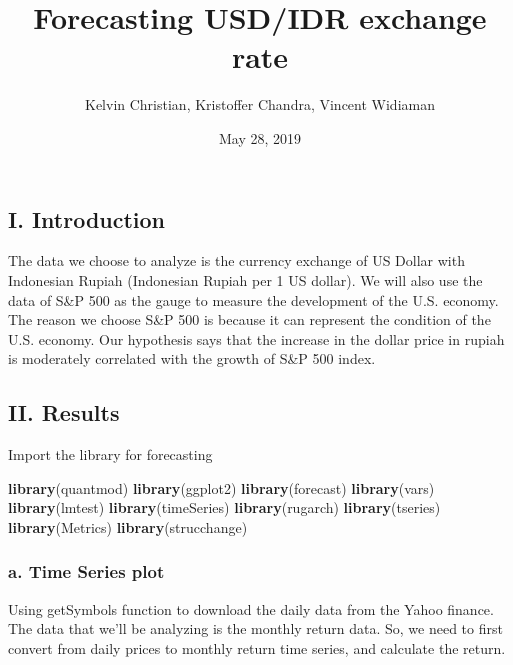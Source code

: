 \documentclass[]{article}
\title{Forecasting USD/IDR exchange rate}
\author{Kelvin Christian, Kristoffer Chandra, Vincent Widiaman}
\date{May 28, 2019}
\newenvironment{Shaded}{\begin{snugshade}}{\end{snugshade}}
\newcommand{\KeywordTok}[1]{\textcolor[rgb]{0.13,0.29,0.53}{\textbf{#1}}}
\newcommand{\NormalTok}[1]{#1}
\begin{document}
\maketitle

\subsection{I. Introduction}\label{i.-introduction}

The data we choose to analyze is the currency exchange of US Dollar with
Indonesian Rupiah (Indonesian Rupiah per 1 US dollar). We will also use
the data of S\&P 500 as the gauge to measure the development of the U.S.
economy. The reason we choose S\&P 500 is because it can represent the
condition of the U.S. economy. Our hypothesis says that the increase in
the dollar price in rupiah is moderately correlated with the growth of
S\&P 500 index.

\subsection{II. Results}\label{ii.-results}

Import the library for forecasting

\begin{Shaded}
\begin{Highlighting}[]
\KeywordTok{library}\NormalTok{(quantmod)}
\KeywordTok{library}\NormalTok{(ggplot2)}
\KeywordTok{library}\NormalTok{(forecast)}
\KeywordTok{library}\NormalTok{(vars)}
\KeywordTok{library}\NormalTok{(lmtest)}
\KeywordTok{library}\NormalTok{(timeSeries)}
\KeywordTok{library}\NormalTok{(rugarch)}
\KeywordTok{library}\NormalTok{(tseries)}
\KeywordTok{library}\NormalTok{(Metrics)}
\KeywordTok{library}\NormalTok{(strucchange)}
\end{Highlighting}
\end{Shaded}

\subsubsection{a. Time Series plot}\label{a.-time-series-plot}

Using getSymbols function to download the daily data from the Yahoo
finance. The data that we'll be analyzing is the monthly return data.
So, we need to first convert from daily prices to monthly return time
series, and calculate the return.
\end{document}

